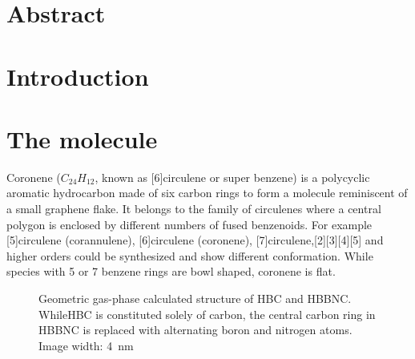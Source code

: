 \label{section:HBBNC}
\label{section:HBC}
\section{Abstract}
\section{Introduction}
\section{The molecule}
Coronene ($C_{24}H_{12}$, known as [6]circulene or super benzene) is a polycyclic aromatic hydrocarbon made of six carbon rings to form a molecule reminiscent of a small graphene flake. It belongs to the family of circulenes where a central polygon is enclosed by different numbers of fused benzenoids. For example [5]circulene (corannulene), [6]circulene (coronene), [7]circulene,[2][3][4][5] and higher orders could be synthesized and show different conformation. While species with 5 or 7 benzene rings are bowl shaped, coronene is flat.

\begin{figure}[h!]\centering
	 \quad
	\caption{Geometric gas-phase calculated structure of  HBC and  HBBNC. WhileHBC is constituted solely of carbon, the central carbon ring in HBBNC is replaced with alternating boron and nitrogen atoms. Image width: \SI{4}{\nano \meter}}
	\label{fig:HBBNC+HBC}
\end{figure}

